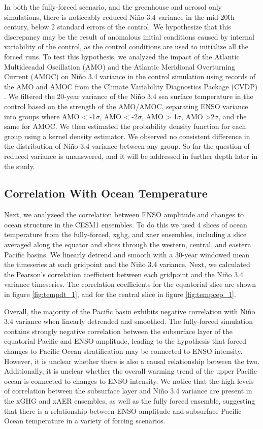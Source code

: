 \documentclass[draft]{agujournal2019}
\begin{document}
In both the fully-forced scenario, and the greenhouse and aerosol only simulations, there is noticeably reduced Ni\~{n}o 3.4 variance in the mid-20\^{th} century, below 2 standard errors of the control. We hypothesize that this discrepancy may be the result of anomalous initial conditions caused by internal variability of the control, as the control conditions are used to initialize all the forced runs. To test this hypothesis, we analyzed the impact of the Atlantic Multidecadal Oscillation (AMO) and the Atlantic Meridional Overturning Current (AMOC) on Ni\~{n}o 3.4 variance in the control simulation using records of the AMO and AMOC from the Climate Variability Diagnostics Package (CVDP) \cite{phillips2014evaluating}. We filtered the 20-year variance of the Ni\~{n}o 3.4 sea surface temperature in the control based on the strength of the AMO/AMOC, separating ENSO variance into groups where AMO < -1$\sigma$, AMO < -2$\sigma$, AMO > 1$\sigma$, AMO >2$\sigma$, and the same for AMOC. We then estimated the probability density function for each group using a kernel density estimator. We observed no consistent difference in the distribution of Ni\~{n}o 3.4 variance between any group. So far the question of reduced variance is unanswered, and it will be addressed in further depth later in the study.

\subsection{Correlation With Ocean Temperature}
Next, we analyzeed the correlation between ENSO amplitude and changes to ocean structure in the CESM1 ensembles. To do this we used 4 slices of ocean temperature from the fully-forced, xghg, and xaer ensembles, including a slice averaged along the equator and slices through the western, central, and eastern Pacific basins. We linearly detrend and smooth with a 30-year windowed mean the timeseries at each gridpoint and the Ni\~{n}o 3.4 variance. Next, we calculated the Pearson's correlation coefficient between each gridpoint and the Ni\~{n}o 3.4 variance timeseries. The correlation coefficients for the equatorial slice are shown in figure \ref{fig:tempdt_1}, and for the central slice in figure \ref{fig:tempcep_1}.

Overall, the majority of the Pacific basin exhibits negative correlation with Ni\~{n}o 3.4 variance when linearly detrended and smoothed. The fully-forced simulation contains strongly negative correlation between the subsurface layer of the equatorial Pacific and ENSO amplitude, leading to the hypothesis that forced changes to Pacific Ocean stratification may be connected to ENSO intensity. However, it is unclear whether there is also a causal relationship between the two. Additionally, it is unclear whether the overall warming trend of the upper Pacific ocean is connected to changes to ENSO intensity. We notice that the high levels of correlation between the subsurface layer and Ni\~{n}o 3.4 variance are present in the xGHG and xAER ensembles, as well as the fully forced ensemble, suggesting that there is a relationship between ENSO amplitude and subsurface Pacific Ocean temperature in a variety of forcing scenarios.
\end{document}
